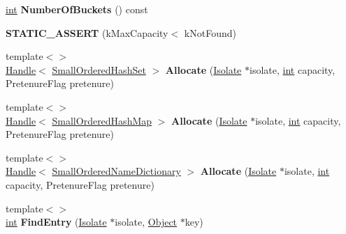 \begin{DoxyCompactItemize}
\mbox{\hyperlink{classint}{int}} {\bfseries Number\+Of\+Buckets} () const
\item 
\mbox{\label{classv8_1_1internal_1_1SmallOrderedHashTable_ad7890ac86ccfe31ade4597494148cea3}} 
{\bfseries S\+T\+A\+T\+I\+C\+\_\+\+A\+S\+S\+E\+RT} (k\+Max\+Capacity$<$ k\+Not\+Found)
\item 
\mbox{\label{classv8_1_1internal_1_1SmallOrderedHashTable_a4ec76674b229c57b65d289aacb6cff2f}} 
{\footnotesize template$<$$>$ }\\\mbox{\hyperlink{classv8_1_1internal_1_1Handle}{Handle}}$<$ \mbox{\hyperlink{classv8_1_1internal_1_1SmallOrderedHashSet}{Small\+Ordered\+Hash\+Set}} $>$ {\bfseries Allocate} (\mbox{\hyperlink{classv8_1_1internal_1_1Isolate}{Isolate}} $\ast$isolate, \mbox{\hyperlink{classint}{int}} capacity, Pretenure\+Flag pretenure)
\item 
\mbox{\label{classv8_1_1internal_1_1SmallOrderedHashTable_abe8d18ff799332b407d0296ef0cb7341}} 
{\footnotesize template$<$$>$ }\\\mbox{\hyperlink{classv8_1_1internal_1_1Handle}{Handle}}$<$ \mbox{\hyperlink{classv8_1_1internal_1_1SmallOrderedHashMap}{Small\+Ordered\+Hash\+Map}} $>$ {\bfseries Allocate} (\mbox{\hyperlink{classv8_1_1internal_1_1Isolate}{Isolate}} $\ast$isolate, \mbox{\hyperlink{classint}{int}} capacity, Pretenure\+Flag pretenure)
\item 
\mbox{\label{classv8_1_1internal_1_1SmallOrderedHashTable_a6edaa3df3fc35809f61b360cd6e7f579}} 
{\footnotesize template$<$$>$ }\\\mbox{\hyperlink{classv8_1_1internal_1_1Handle}{Handle}}$<$ \mbox{\hyperlink{classv8_1_1internal_1_1SmallOrderedNameDictionary}{Small\+Ordered\+Name\+Dictionary}} $>$ {\bfseries Allocate} (\mbox{\hyperlink{classv8_1_1internal_1_1Isolate}{Isolate}} $\ast$isolate, \mbox{\hyperlink{classint}{int}} capacity, Pretenure\+Flag pretenure)
\item 
\mbox{\label{classv8_1_1internal_1_1SmallOrderedHashTable_a68f31148f2ad5f103213de73921ec724}} 
{\footnotesize template$<$$>$ }\\\mbox{\hyperlink{classint}{int}} {\bfseries Find\+Entry} (\mbox{\hyperlink{classv8_1_1internal_1_1Isolate}{Isolate}} $\ast$isolate, \mbox{\hyperlink{classv8_1_1internal_1_1Object}{Object}} $\ast$key)
\end{DoxyCompactItemize}
